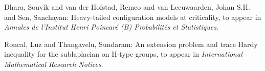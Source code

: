 \item \label{sen:models-at-criticality} Dhara, Souvik and van der Hofstad, Remco and van Leeuwaarden, Johan S.H. and Sen, Sanchayan: Heavy-tailed configuration models at criticality, to appear in {\em Annales de l'Institut Henri
              Poincar\'e (B) Probabilit\'es et Statistiques}.

\item \label{thangavelu:H-type-groups} Roncal, Luz and Thangavelu, Sundaram: An extension problem and trace Hardy
      inequality for the sublaplacian on H-type groups, to appear in {\em International Mathematical Research Notices}.
